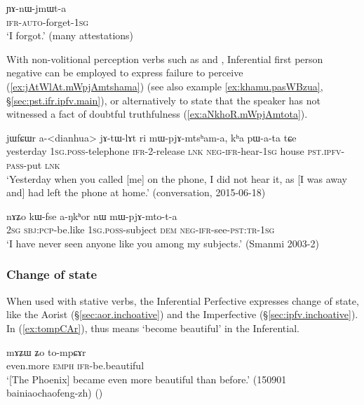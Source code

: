 \begin{exe}
\ex \label{ex:YAnWjmWta}
\gll ɲɤ-nɯ-jmɯt-a \\
 \textsc{ifr}-\textsc{auto}-forget-\textsc{1sg} \\
\glt `I forgot.' (many attestations)
\end{exe}


With non-volitional perception verbs such as  and , Inferential first person negative can be employed to express failure to perceive (\ref{ex:jAtWlAt.mWpjAmtshama}) (see also example \ref{ex:khamu.pasWBzua}, §\ref{sec:pst.ifr.ipfv.main}), or alternatively to state that the speaker has not witnessed a fact of doubtful truthfulness (\ref{ex:aNkhoR.mWpjAmtota}).

\begin{exe}
\ex \label{ex:jAtWlAt.mWpjAmtshama}
\gll jɯfɕɯr a-<dianhua> jɤ-tɯ-lɤt ri mɯ-pjɤ-mtsʰam-a, kʰa pɯ-a-ta tɕe  \\
yesterday \textsc{1sg}.\textsc{poss}-telephone  \textsc{ifr}-2-release \textsc{lnk} \textsc{neg}-\textsc{ifr}-hear-\textsc{1sg} house \textsc{pst}.\textsc{ipfv}-\textsc{pass}-put \textsc{lnk} \\
\glt `Yesterday when you called [me] on the phone, I did not hear it, as [I was away and] had left the phone at home.' (conversation, 2015-06-18)
\end{exe}


\begin{exe}
\ex \label{ex:aNkhoR.mWpjAmtota}
\gll nɤʑo kɯ-fse a-ŋkʰor nɯ mɯ-pjɤ-mto-t-a \\
\textsc{2sg} \textsc{sbj}:\textsc{pcp}-be.like \textsc{1sg}.\textsc{poss}-subject \textsc{dem} \textsc{neg}-\textsc{ifr}-see-\textsc{pst}:\textsc{tr}-\textsc{1sg} \\
\glt `I have never seen anyone like you among my subjects.' (Smanmi 2003-2)
\end{exe}


\subsubsection{Change of state}   \label{sec:ifr.inchoative}
When used with stative verbs, the Inferential Perfective expresses change of state, like the Aorist (§\ref{sec:aor.inchoative}) and the Imperfective (§\ref{sec:ipfv.inchoative}). In (\ref{ex:tompCAr}),  thus means `become beautiful' in the Inferential.

\begin{exe}
\ex \label{ex:tompCAr}
\gll mɤʑɯ ʑo to-mpɕɤr \\
even.more \textsc{emph} \textsc{ifr}-be.beautiful \\
\glt `[The Phoenix] became even more beautiful than before.' (150901 bainiaochaofeng-zh) ()
\end{exe}

